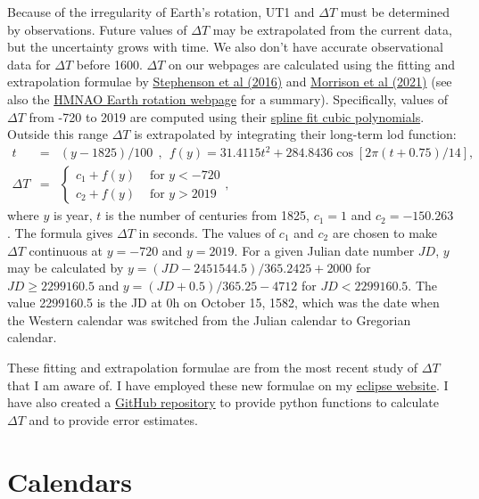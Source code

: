 \documentclass[12pt]{article}
\newcommand \beqn {\begin{eqnarray}}
\newcommand \eeqn {\end{eqnarray}}
\begin{document}
Because of the irregularity of Earth's rotation, UT1 and $\Delta T$ must be 
determined by observations. Future values of $\Delta T$ may be extrapolated 
from the current data, but the uncertainty grows with time. We also don't have 
accurate observational data for $\Delta T$  before 1600. $\Delta T$ on our 
webpages are calculated using the fitting and extrapolation formulae by 
\href{https://royalsocietypublishing.org/doi/10.1098/rspa.2016.0404}{Stephenson et al (2016)} 
and \href{https://royalsocietypublishing.org/doi/10.1098/rspa.2020.0776}{Morrison et al (2021)} 
(see also the \href{http://astro.ukho.gov.uk/nao/lvm/}{HMNAO Earth rotation webpage} 
for a summary). 
Specifically, values of $\Delta T$ from -720 to 2019 are computed using their 
\href{http://astro.ukho.gov.uk/nao/lvm/Table-S15.2020.txt}{spline fit cubic polynomials}. 
Outside this range $\Delta T$ is extrapolated by integrating their long-term lod function:
\beqn
 t &=& (y - 1825)/100 \ \ , \ \  f(y) = 31.4115t^2 + 284.8436 \cos [2\pi(t + 0.75)/14] , \\
 \Delta T &=& \left\{ \begin{array}{cc} c_1 + f(y) & \mbox{ for } y < -720 \\
c_2 + f(y) & \mbox{ for } y > 2019 \end{array} \right. ,
\eeqn
where $y$ is year, $t$ is the number of centuries from 1825, $c_1=1$ and 
$c_2=-150.263$. The formula gives $\Delta T$ in seconds. The values of $c_1$ and $c_2$
are chosen to make $\Delta T$ continuous at $y=-720$ and $y=2019$. For a given Julian 
date number $JD$, $y$ may be calculated by $y = (JD-2451544.5)/365.2425 + 2000$ for 
$JD \geq 2299160.5$ and $y = (JD+0.5)/365.25 - 4712$ for $JD < 2299160.5$. The value 
2299160.5 is the JD at 0h on October 15, 1582, which was the date when the Western 
calendar was switched from the Julian calendar to Gregorian calendar. 

These fitting and extrapolation formulae are from the most recent study 
of $\Delta T$ that I am aware of. I have employed these new formulae on my 
\href{http://ytliu.epizy.com/eclipse/}{eclipse website}. I have also created 
a \href{https://github.com/ytliu0/DeltaT}{GitHub repository} to provide python 
functions to calculate $\Delta T$ and to provide error estimates.

\section{Calendars}
\end{document}

